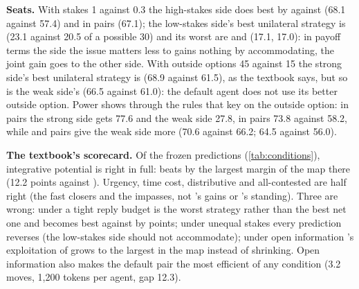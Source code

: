 \textbf{Seats.} With stakes 1 against 0.3 the high-stakes side does best by \collaborating{} against \neutral{} (68.1 against 57.4) and in \accommodating{} pairs (67.1); the low-stakes side's best unilateral strategy is \competing{} (23.1 against 20.5 of a possible 30) and its worst are \accommodating{} and \avoiding{} (17.1, 17.0): in payoff terms the side the issue matters less to gains nothing by accommodating, the joint gain goes to the other side. With outside options 45 against 15 the strong side's best unilateral strategy is \competing{} (68.9 against 61.5), as the textbook says, but so is the weak side's (66.5 against 61.0): the default agent does not use its better outside option. Power shows through the rules that key on the outside option: in \avoiding{} pairs the strong side gets 77.6 and the weak side 27.8, in \accommodating{} pairs 73.8 against 58.2, while \collaborating{} and \compromising{} pairs give the weak side more (70.6 against 66.2; 64.5 against 56.0).

\textbf{The textbook's scorecard.} Of the frozen predictions (\cref{tab:conditions}), integrative potential is right in full: \collaborating{} beats \compromising{} by the largest margin of the map there (12.2 points against \neutral). Urgency, time cost, distributive and all-contested are half right (the fast closers and the impasses, not \competing's gains or \compromising's standing). Three are wrong: under a tight reply budget \avoiding{} is the worst strategy rather than the best net one and \competing{} becomes best against \neutral{} by points; under unequal stakes every prediction reverses (the low-stakes side should not accommodate); under open information \competing's exploitation of \neutral{} grows to the largest in the map instead of shrinking. Open information also makes the default pair the most efficient of any condition (3.2 moves, 1{,}200 tokens per agent, gap 12.3).

